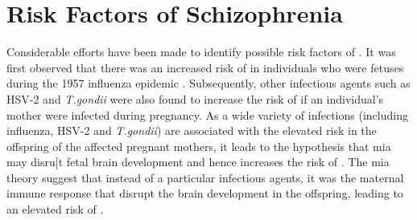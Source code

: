 	
	\section{Risk Factors of Schizophrenia}
	Considerable efforts have been made to identify possible risk factors of . 
	It was first observed that there was an increased risk of  in individuals who were fetuses during the 1957 influenza epidemic \citep{Mednick1958}. 
	Subsequently, other infectious agents such as HSV-2 and \textit{T.gondii} were also found to increase the risk of  if an individual's mother were infected during pregnancy.
	As a wide variety of infections (including influenza, HSV-2 and \textit{T.gondii}) are associated with the elevated  risk in the offspring of the affected pregnant mothers, it leads to the hypothesis that \gls{mia} may disru[t fetal brain development and hence increases the risk of  \citep{Brown2010}.
	The \gls{mia} theory suggest that instead of a particular infectious agents, it was the maternal immune response that disrupt the brain development in the offspring, leading to an elevated risk of .

